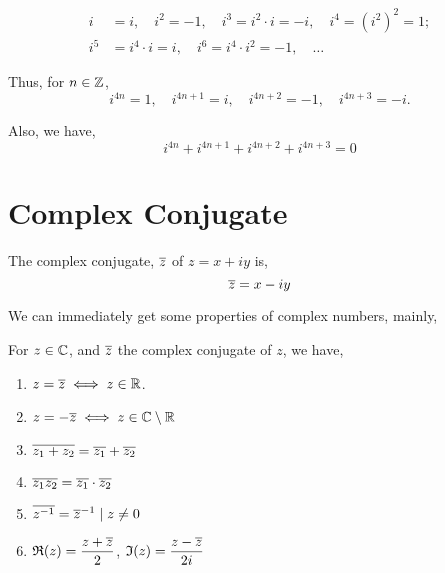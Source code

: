 \begin{align*}
    i &= i, \quad i^2 = -1, \quad i^3 = i^2 \cdot i = -i, \quad i^4 = (i^2)^2 = 1; \\
    i^5 &= i^4 \cdot i = i, \quad i^6 = i^4 \cdot i^2 = -1, \quad \dots  
\end{align*}

Thus, for \(n \in \mathbb Z\), 
\[i^{4n} = 1, \quad i^{4n+1} = i, \quad i^{4n+2} = -1, \quad i^{4n+3} = -i.\]

Also, we have, 
\[i^{4n} + i^{4n+1} + i^{4n+2} + i^{4n+3} = 0\]

\section{Complex Conjugate}

\begin{definition}
    The complex conjugate, \(\overline{z}\) of \(z = x + iy\) is,
    \[\overline{z} = x - iy\]
\end{definition}

We can immediately get some properties of complex numbers,
mainly,

\begin{proposition}
    For \(z \in \mathbb C\), and \(\overline{z}\) the complex conjugate of \(z\), we have,
    \begin{enumerate}
        \item \(z = \overline{z} \iff z \in \mathbb R\).
        \item \(z = -\overline{z} \iff z \in \mathbb C \setminus \mathbb R\)
        \item \(\overline{z_1 + z_2} = \overline{z_1} + \overline{z_2}\)
        \item \(\overline{z_1z_2} = \overline{z_1} \cdot \overline{z_2}\)
        \item \(\overline{z^{-1}} = \overline{z}^{-1} \mid z \ne 0\)
        \item  \(\mathfrak{R}(z) = \dfrac{z + \overline{z}}{2}\), \(\mathfrak{I}(z) = \dfrac{z - \overline{z}}{2i}\) 
    \end{enumerate}
\end{proposition}



